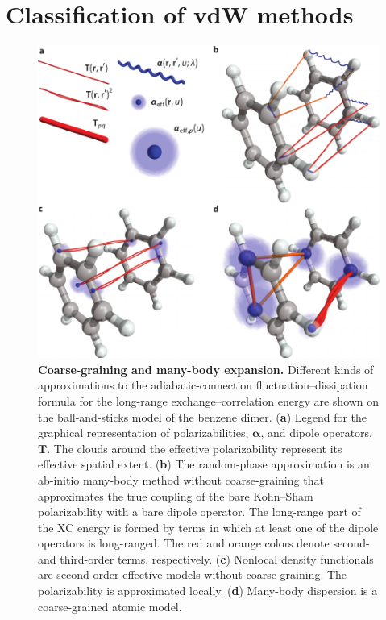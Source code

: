 \section{Classification of vdW methods}

\begin{figure}
\includegraphics[center]{media/methods-diagrams}
\caption{\textbf{Coarse-graining and many-body expansion.}
Different kinds of approximations to the adiabatic-connection fluctuation--dissipation formula for the long-range exchange--correlation energy are shown on the ball-and-sticks model of the benzene dimer.
(\textbf a) Legend for the graphical representation of polarizabilities, $\boldsymbol\alpha$, and dipole operators, $\mathbf T$.
The clouds around the effective polarizability represent its effective spatial extent.
(\textbf b) The random-phase approximation is an ab-initio many-body method without coarse-graining that approximates the true coupling of the bare Kohn--Sham polarizability with a bare dipole operator.
The long-range part of the XC energy is formed by terms in which at least one of the dipole operators is long-ranged.
The red and orange colors denote second- and third-order terms, respectively.
(\textbf c) Nonlocal density functionals are second-order effective models without coarse-graining.
The polarizability is approximated locally.
(\textbf d) Many-body dispersion is a coarse-grained atomic model.
}\label{fig:diagrams}
\end{figure}

